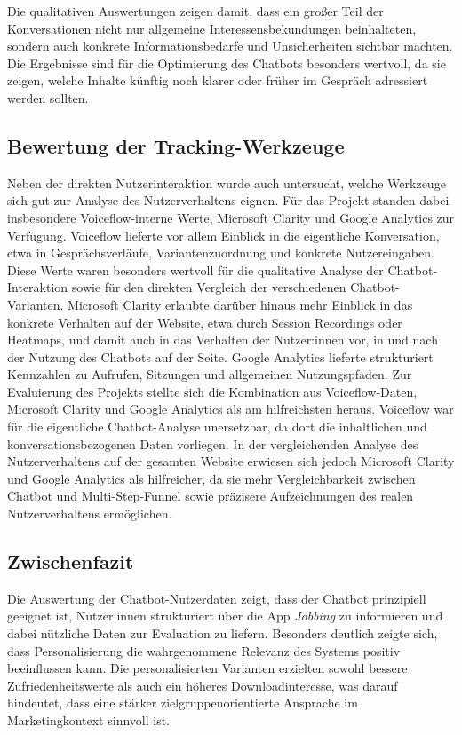 Die qualitativen Auswertungen zeigen damit, dass ein großer Teil der 
Konversationen nicht nur allgemeine Interessensbekundungen beinhalteten, sondern 
auch konkrete Informationsbedarfe und Unsicherheiten sichtbar machten. Die 
Ergebnisse sind für die Optimierung des Chatbots besonders wertvoll, da sie 
zeigen, welche Inhalte künftig noch klarer oder früher im Gespräch adressiert 
werden sollten.

\subsection{Bewertung der Tracking-Werkzeuge}

Neben der direkten Nutzerinteraktion wurde auch untersucht, welche Werkzeuge
sich gut zur Analyse des Nutzerverhaltens eignen. Für das Projekt standen
dabei insbesondere Voiceflow-interne Werte, Microsoft Clarity und Google
Analytics zur Verfügung.
Voiceflow lieferte vor allem Einblick in die eigentliche
Konversation, etwa in Gesprächsverläufe, Variantenzuordnung und
konkrete Nutzereingaben. Diese Werte waren besonders wertvoll für die
qualitative Analyse der Chatbot-Interaktion sowie für den direkten
Vergleich der verschiedenen Chatbot-Varianten.
Microsoft Clarity erlaubte darüber hinaus mehr Einblick in das konkrete
Verhalten auf der Website, etwa durch Session Recordings oder Heatmaps, und
damit auch in das Verhalten der Nutzer:innen vor, in und nach der Nutzung
des Chatbots auf der Seite. Google Analytics lieferte
strukturiert Kennzahlen zu Aufrufen, Sitzungen und allgemeinen
Nutzungspfaden.
Zur Evaluierung des Projekts stellte sich die Kombination aus
Voiceflow-Daten, Microsoft Clarity und Google Analytics als am
hilfreichsten heraus. Voiceflow war für die eigentliche Chatbot-Analyse
unersetzbar, da dort die inhaltlichen und konversationsbezogenen Daten
vorliegen. In der vergleichenden Analyse des Nutzerverhaltens auf der gesamten
Website erwiesen sich jedoch Microsoft Clarity und Google Analytics als
hilfreicher, da sie mehr Vergleichbarkeit zwischen Chatbot und
Multi-Step-Funnel sowie präzisere Aufzeichnungen des realen
Nutzerverhaltens ermöglichen.

\subsection{Zwischenfazit}

Die Auswertung der Chatbot-Nutzerdaten zeigt, dass der Chatbot prinzipiell 
geeignet ist, Nutzer:innen strukturiert über die App \textit{Jobbing} zu informieren und 
dabei nützliche Daten zur Evaluation zu liefern. Besonders deutlich zeigte sich, 
dass Personalisierung die wahrgenommene Relevanz des Systems positiv beeinflussen 
kann. Die personalisierten Varianten erzielten sowohl bessere Zufriedenheitswerte 
als auch ein höheres Downloadinteresse, was darauf hindeutet, dass eine stärker 
zielgruppenorientierte Ansprache im Marketingkontext sinnvoll ist.

